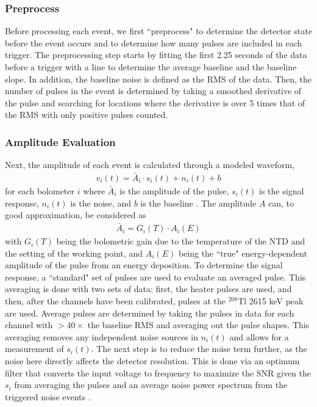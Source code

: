 \subsubsection*{Preprocess}
Before processing each event, we first ``preprocess" to determine the detector state before the event occurs and to determine how many pulses are included in each trigger.
The preprocessing step starts by fitting the first 2.25 seconds of the data before a trigger with a line to determine the average baseline and the baseline slope.
In addition, the baseline noise is defined as the RMS of the data.
Then, the number of pulses in the event is determined by taking a smoothed derivative of the pulse and searching for locations where the derivative is over 5 times that of the RMS with only positive pulses counted.

\subsubsection*{Amplitude Evaluation}
Next, the amplitude of each event is calculated through a modeled waveform,
\begin{align}
    v_i(t) = \bar{A}_i\cdot s_i(t) + n_i(t) + b
    \label{eq:pulse function}
\end{align}
for each bolometer $i$ where $\bar{A}_i$ is the amplitude of the pulse, $s_i(t)$ is the signal response, $n_i(t)$ is the noise, and $b$ is the baseline \cite{Alduino:2016zrl}.
The amplitude $A$ can, to good approximation, be considered as
\begin{align}
    \bar{A}_i = G_i(T)\cdot A_i(E)
\end{align}
with $G_i(T)$ being the bolometric gain due to the temperature of the NTD and the setting of the working point, and $A_i(E)$ being the ``true" energy-dependent amplitude of the pulse from an energy deposition.
To determine the signal response, a ``standard" set of pulses are used to evaluate an averaged pulse.
This averaging is done with two sets of data: first, the heater pulses are used, and then, after the channels have been calibrated, pulses at the $^{208}$Tl 2615 keV peak are used.
Average pulses are determined by taking the pulses in data for each channel with $>40\times$ the baseline RMS and averaging out the pulse shapes.
This averaging removes any independent noise sources in $n_i(t)$ and allows for a measurement of $s_i(t)$.
The next step is to reduce the noise term further, as the noise here directly affects the detector resolution.
This is done via an optimum filter that converts the input voltage to frequency to maximize the SNR given the $s_i$ from averaging the pulses and an average noise power spectrum from the triggered noise events \cite{Gatti1986}.
